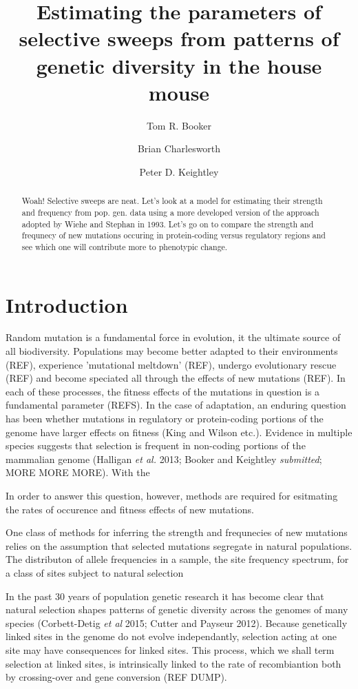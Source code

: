 \documentclass{article}
\title{\textbf{Estimating the parameters of selective sweeps from patterns of genetic diversity in the house mouse}}
\author[1,*]{Tom R. Booker}
\author[1]{Brian Charlesworth}
\author[1]{Peter D. Keightley}
\affil[1]{Institute of Evolutionary Biology, University of Edinburgh, Edinburgh}
\affil[*]{\emph{t.r.booker@sms.ed.ac.uk}}
\begin{document}
\maketitle
\begin{abstract}
Woah! Selective sweeps are neat. Let's look at a model for estimating their strength and frequency from pop. gen. data using a more developed version of the approach adopted by Wiehe and Stephan in 1993. Let's go on to compare the strength and frequnecy of new mutations occuring in protein-coding versus regulatory regions and see which one will contribute more to phenotypic change.

\end{abstract}

\section*{Introduction}

Random mutation is a fundamental force in evolution, it the ultimate source of all biodiversity. Populations may become better adapted to their environments (REF), experience 'mutational meltdown' (REF), undergo evolutionary rescue (REF) and become speciated all through the effects of new mutations (REF). In each of these processes, the fitness effects of the mutations in question is a fundamental parameter (REFS). In the case of adaptation, an enduring question has been whether mutations in regulatory or protein-coding portions of the genome have larger effects on fitness (King and Wilson etc.). Evidence in multiple species suggests that selection is frequent in non-coding portions of the mammalian genome (Halligan \textit{et al.} 2013; Booker and Keightley \textit{submitted}; MORE MORE MORE). With the 

In order to answer this question, however, methods are required for esitmating the rates of occurence and fitness effects of new mutations.

One class of methods for inferring the strength and frequnecies of new mutations relies on the  assumption that selected mutations segregate in natural populations. The distributon of allele frequencies in a sample, the site frequency spectrum, for a class of sites subject to natural selection 



In the past 30 years of population genetic research it has become clear that natural selection shapes patterns of genetic diversity across the genomes of many species (Corbett-Detig \textit{et al} 2015; Cutter and Payseur 2012). Because genetically linked sites in the genome do not evolve independantly, selection acting at one site may have consequences for linked sites. This process, which we shall term selection at linked sites, is intrinsically linked to the rate of recombiantion both by crossing-over and gene conversion (REF DUMP). 
\end{document}
